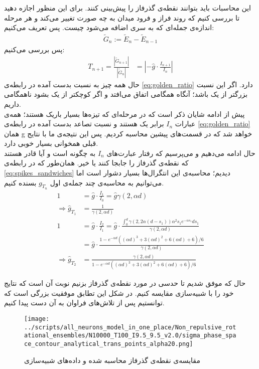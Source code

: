 این محاسبات باید بتوانند نقطه‌ی گذرفاز را پیش‌بینی کنند. برای این منظور اجازه دهید تا بررسی کنیم که روند فراز و فرود میدان به چه صورت تغییر می‌کند و هر مرحله اندازه‌ی جمله‌ای که به سری اضافه می‌شود چیست. پس تعریف می‌کنیم:
\begin{align}
	\tilde{G}_{n} := \tilde{E}_{n} - \tilde{E}_{n-1}
\end{align}
پس بررسی می‌کنیم:
\begin{align}
	T_{n+1} = \frac{|\tilde{G}_{n+1}|}{|\tilde{G}_{n}|} &= |-\hat{g} \cdot \frac{I_{n+1}}{I_n}|
	\label{eq:golden_ratio}
\end{align}
حال همه چیز به نسبت بدست آمده در رابطه‌ی
\ref{eq:golden_ratio}
دارد. اگر این نسبت بزرگتر از یک باشد؛ آنگاه همگامی اتفاق می‌افتد و اگر کوچکتر از یک بشود ناهمگامی داریم.\\
پیش از ادامه شایان ذکر است که در مرحله‌ای که تیزه‌ها بسیار باریک هستند؛ همه‌ی عبارات 
$I_n$
برابر یک هستند و نسبت تصاعد بدست آمده در رابطه‌ی 
\ref{eq:golden_ratio}
همان g خواهد شد که در قسمت‌های پیشین محاسبه کردیم. پس این نتیجه‌ی ما با نتایج قبلی همخوانی بسیار خوبی دارد.\\

حال ادامه می‌دهیم و می‌پرسیم که رفتار عبارت‌های 
$I_n$
به چگونه است و آیا قادر هستند که نقطه‌ی گذرفاز را جابجا کنند یا خیر. همان‌طور که در رابطه‌ی 
\ref{eq:spikes_sandwiches}
دیدیم؛ محاسبه‌ی این انتگرال‌ها بسیار دشوار است اما می‌توانیم به محاسبه‌ی چند جمله‌ی اول 
$g_{T_n}$
بسنده کنیم.
\begin{align}
	1 &= \hat{g} \cdot \frac{I_1}{I_0} = \hat{g} \gamma(2,\alpha d)\\
	\Rightarrow \hat{g}_{T_1} &= \frac{1}{\gamma(2,\alpha d)}\\
	1 &= \hat{g} \cdot \frac{I_2}{I_1} = \hat{g} \cdot \frac{\int_0^{d} \gamma(2,2\alpha (d-s_1)) \alpha^2 s_1 e^{-\alpha s_1} ds_1 }{\gamma(2,\alpha d)}\\
	&= \hat{g} \cdot \frac{1 - e^{- \alpha d}( (\alpha d)^3 + 3(\alpha d)^2 + 6(\alpha d) + 6)/6}{\gamma(2,\alpha d)}\\
	\Rightarrow \hat{g}_{T_2} &= \frac{\gamma(2,\alpha d)}{1 - e^{- \alpha d}( (\alpha d)^3 + 3(\alpha d)^2 + 6(\alpha d) + 6)/6}
\end{align}

حال که موفق شدیم تا حدسی در مورد نقطه‌ی گذرفاز بزنیم نوبت آن است که نتایج خود را با شبیه‌سازی مقایسه کنیم. در شکل
این تطابق موفقیت بزرگی است که توانستیم پس از تلاش‌های فراوان به آن دست پیدا کنیم.
\\

\begin{figure}
	\texttt{[image: ../scripts/all\_neurons\_model\_in\_one\_place/Non\_repulsive\_rotational\_ensembles/N10000\_T100\_I9.5\_9.5\_v2.0/sigma\_phase\_space\_contour\_analytical\_trans\_points\_alpha20.png]}
	\caption{مقایسه‌ی نقطه‌ی گذرفاز محاسبه شده و داده‌های شبیه‌سازی}
\end{figure}







